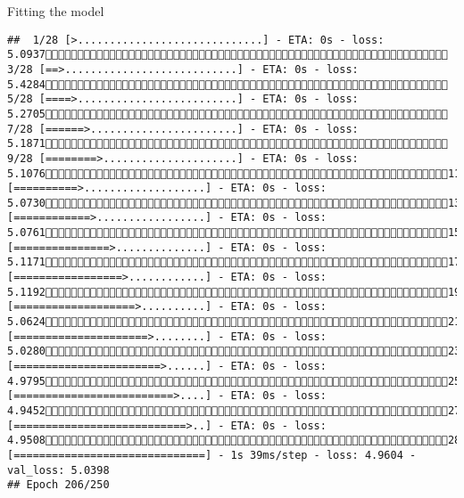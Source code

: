 \documentclass[
  ignorenonframetext,
]{beamer}
\begin{document}
\begin{frame}[fragile]{Fitting the model}
\begin{verbatim}
##  1/28 [>.............................] - ETA: 0s - loss: 5.0937 3/28 [==>...........................] - ETA: 0s - loss: 5.4284 5/28 [====>.........................] - ETA: 0s - loss: 5.2705 7/28 [======>.......................] - ETA: 0s - loss: 5.1871 9/28 [========>.....................] - ETA: 0s - loss: 5.107611/28 [==========>...................] - ETA: 0s - loss: 5.073013/28 [============>.................] - ETA: 0s - loss: 5.076115/28 [===============>..............] - ETA: 0s - loss: 5.117117/28 [=================>............] - ETA: 0s - loss: 5.119219/28 [===================>..........] - ETA: 0s - loss: 5.062421/28 [=====================>........] - ETA: 0s - loss: 5.028023/28 [=======================>......] - ETA: 0s - loss: 4.979525/28 [=========================>....] - ETA: 0s - loss: 4.945227/28 [===========================>..] - ETA: 0s - loss: 4.950828/28 [==============================] - 1s 39ms/step - loss: 4.9604 - val_loss: 5.0398
## Epoch 206/250

\end{verbatim}
\end{frame}
\end{document}
